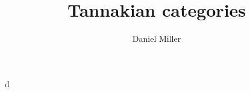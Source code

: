 \documentclass{article}
\title{Tannakian categories}
\author{Daniel Miller}
\begin{document}
\maketitle





d
\end{document}
